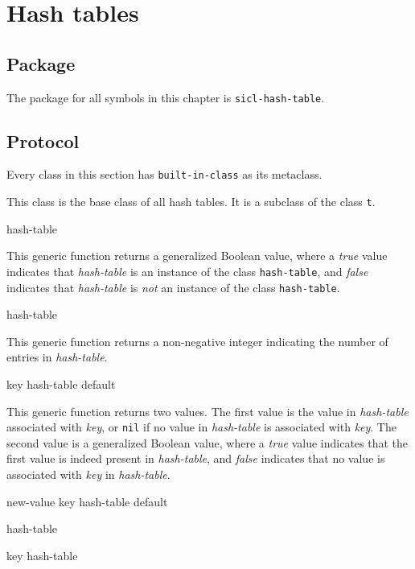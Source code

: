 \chapter{Hash tables}

\section{Package}

The package for all symbols in this chapter is \texttt{sicl-hash-table}.

\section{Protocol}

Every class in this section has \texttt{built-in-class} as its
metaclass.


This class is the base class of all hash tables.  It is a subclass of
the class \texttt{t}.


{\small{} {hash-table}
}

This generic function returns a generalized Boolean value, where a
\textsl{true} value indicates that \textit{hash-table} is an instance
of the class \texttt{hash-table}, and \textsl{false} indicates that
\textit{hash-table} is \emph{not} an instance of the class
\texttt{hash-table}.

{\small{} {hash-table}
}

This generic function returns a non-negative integer indicating the
number of entries in \textit{hash-table}.

{\small{} {key hash-table \optional default}
}

This generic function returns two values.  The first value is the
value in \textit{hash-table} associated with \textit{key}, or
\texttt{nil} if no value in \textit{hash-table} is associated with
\textit{key}.  The second value is a generalized Boolean value, where
a \textsl{true} value indicates that the first value is indeed present
in \textit{hash-table}, and \textsl{false} indicates that no value is
associated with \textit{key} in \textit{hash-table}.

{\small{} {new-value key hash-table \optional default}
}

{\small{} {hash-table}
}

{\small{} {key hash-table}
}

